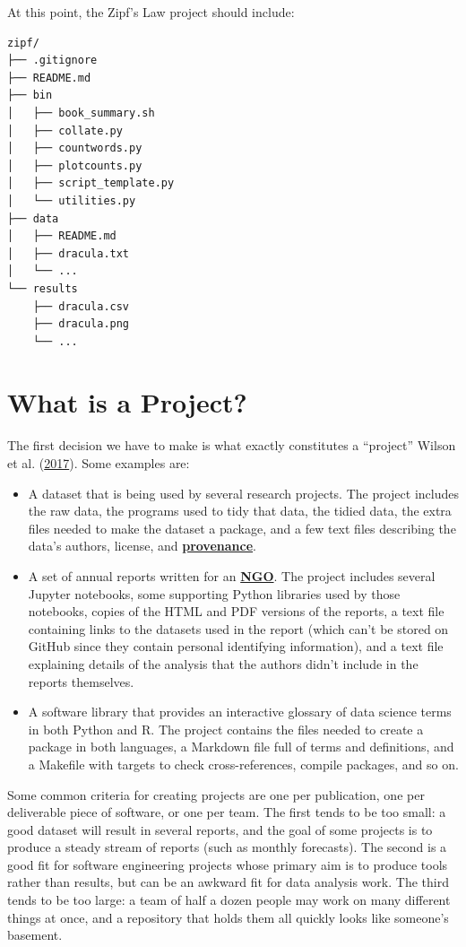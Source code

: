 \documentclass[
]{krantz}
\newcommand{\gref}[2]{\hyperlink{#2}{\textbf{#1}}}
\begin{document}
At this point,
the Zipf's Law project should include:

\begin{verbatim}
zipf/
├── .gitignore
├── README.md
├── bin
│   ├── book_summary.sh
│   ├── collate.py
│   ├── countwords.py
│   ├── plotcounts.py
│   ├── script_template.py
│   └── utilities.py
├── data
│   ├── README.md
│   ├── dracula.txt
│   └── ...
└── results
    ├── dracula.csv
    ├── dracula.png
    └── ...
\end{verbatim}

\hypertarget{teams-scope}{%
\section{What is a Project?}\label{teams-scope}}

The first decision we have to make is what exactly constitutes a ``project'' Wilson et al. (\protect\hyperlink{ref-Wils2017}{2017}).
Some examples are:

\begin{itemize}
\item
  A dataset that is being used by several research projects.
  The project includes the raw data,
  the programs used to tidy that data,
  the tidied data,
  the extra files needed to make the dataset a package,
  and a few text files describing the data's authors, license, and \gref{provenance}{provenance}.
\item
  A set of annual reports written for an \gref{NGO}{ngo}.
  The project includes several Jupyter notebooks,
  some supporting Python libraries used by those notebooks,
  copies of the HTML and PDF versions of the reports,
  a text file containing links to the datasets used in the report
  (which can't be stored on GitHub since they contain personal identifying information),
  and a text file explaining details of the analysis that the authors didn't include in the reports themselves.
\item
  A software library that provides an interactive glossary of data science terms in both Python and R.
  The project contains the files needed to create a package in both languages,
  a Markdown file full of terms and definitions,
  and a Makefile with targets to check cross-references, compile packages, and so on.
\end{itemize}

Some common criteria for creating projects are one per publication,
one per deliverable piece of software,
or one per team.
The first tends to be too small:
a good dataset will result in several reports,
and the goal of some projects is to produce a steady stream of reports (such as monthly forecasts).
The second is a good fit for software engineering projects
whose primary aim is to produce tools rather than results,
but can be an awkward fit for data analysis work.
The third tends to be too large:
a team of half a dozen people may work on many different things at once,
and a repository that holds them all quickly looks like someone's basement.
\end{document}
